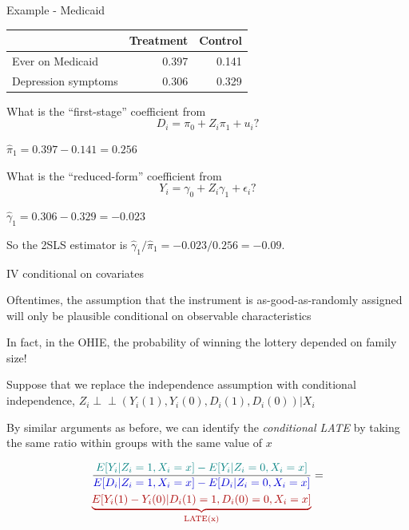 \documentclass[11pt,english,handout]{beamer}
\newenvironment{wideitemize}{\itemize\addtolength{\itemsep}{10pt}}{\enditemize}
\newcommand{\indep}{\perp\!\!\!\!\perp}
\begin{document}
\begin{frame}{Example - Medicaid}
	\begin{tabular}{lrr}
		& Treatment & Control \\ \hline
		Ever on Medicaid & 0.397 & 0.141 \\
		Depression symptoms & 0.306 &  0.329 
	\end{tabular}
	
	\bigskip 
	\begin{wideitemize}
		\item
		What is the ``first-stage'' coefficient from 
		$$D_i = \pi_0 + Z_i \pi_1 + u_i?$$
		
		\pause
		\item
		$\hat\pi_1 = 0.397 - 0.141 = 0.256$
		
		\pause
		\item
		What is the ``reduced-form'' coefficient from 
		$$Y_i = \gamma_0 + Z_i \gamma_1 + \epsilon_i?$$
		
		\pause
		\item
		$\hat\gamma_1 = 0.306 - 0.329 = -0.023$
		
		\pause
		\item
		So the 2SLS estimator is $\hat\gamma_1/\hat\pi_1 = -0.023/0.256 = -0.09$.
	\end{wideitemize}
	
\end{frame}


\begin{frame}{IV conditional on covariates}
	\begin{wideitemize}
		\item
		Oftentimes, the assumption that the instrument is as-good-as-randomly assigned will only be plausible conditional on observable characteristics
		
		\item
		In fact, in the OHIE, the probability of winning the lottery depended on family size!
		
		\pause
		\item
		Suppose that we replace the independence assumption with conditional independence, $Z_i \indep (Y_i(1),Y_i(0),D_i(1), D_i(0)) | X_i$
		
		\item
		By similar arguments as before, we can identify the \textit{conditional LATE} by taking the same ratio within groups with the same value of $x$
		
		\begin{align*}
			&\dfrac{ \color{teal} E[Y_i | Z_i = 1, X_i = x] - E[Y_i | Z_i = 0, X_i = x ]  }{  \color{blue} E[D_i | Z_i = 1, X_i = x] - E[D_i | Z_i = 0 , X_i = x]   }  = \\&{ \color{red}  \underbrace{ E[Y_i(1) - Y_i(0) | D_i(1) = 1, D_i(0) = 0, X_i = x] }_{\text{LATE(x)}} }
		\end{align*}
		
		
	\end{wideitemize}	
\end{frame}
\end{document}
